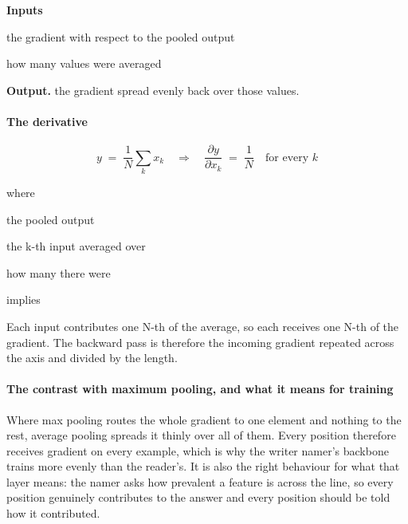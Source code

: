 \noindent\textbf{Inputs}
\begin{description}[leftmargin=2.2em,style=nextline,font=\normalfont\ttfamily]\setlength\itemsep{1pt}
  \item[{dout}] \normalfont the gradient with respect to the pooled output
  \item[{cache}] \normalfont how many values were averaged
\end{description}

\noindent\textbf{Output.} the gradient spread evenly back over those values.


\paragraph{The derivative}

\begin{equation}
y \;=\; \frac{1}{N}\sum_{k} x_k \quad\Longrightarrow\quad \frac{\partial y}{\partial x_k} \;=\; \frac{1}{N} \quad\text{for every } k
\end{equation}

\noindent where
\begin{description}[leftmargin=2.4em,style=nextline,font=\normalfont\ttfamily]\setlength\itemsep{1pt}
  \item[{$y$}] \normalfont the pooled output
  \item[{$x_k$}] \normalfont the k-th input averaged over
  \item[{$N$}] \normalfont how many there were
  \item[{$\Longrightarrow$}] \normalfont implies
\end{description}
Each input contributes one N-th of the average, so each receives one N-th of the gradient. The backward pass is therefore the incoming gradient repeated across the axis and divided by the length.


\paragraph{The contrast with maximum pooling, and what it means for training}
Where max pooling routes the whole gradient to one element and nothing to the rest, average pooling spreads it thinly over all of them. Every position therefore receives gradient on every example, which is why the writer namer's backbone trains more evenly than the reader's. It is also the right behaviour for what that layer means: the namer asks how prevalent a feature is across the line, so every position genuinely contributes to the answer and every position should be told how it contributed.


